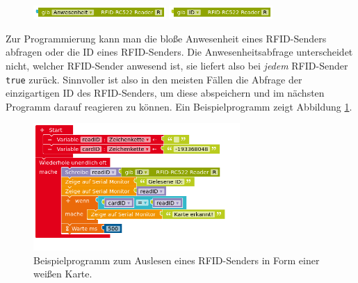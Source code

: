 \begin{figure}
	\centering
	\vspace{-0.5\baselineskip}
	\includegraphics[width=0.45\textwidth]{./pics/rfid-gibAnwesenheit.png}
	\includegraphics[width=0.35\textwidth]{./pics/rfid-gibID.png}
	\vspace{-0.5\baselineskip}
\end{figure}
Zur Programmierung kann man die bloße Anwesenheit eines RFID-Senders abfragen oder die ID eines RFID-Senders. Die Anwesenheitsabfrage unterscheidet nicht, welcher RFID-Sender anwesend ist, sie liefert also bei \emph{jedem} RFID-Sender \texttt{true} zurück. Sinnvoller ist also in den meisten Fällen die Abfrage der einzigartigen ID des RFID-Senders, um diese abspeichern und im nächsten Programm darauf reagieren zu können. Ein Beispielprogramm zeigt Abbildung \ref{abb:rfid-bsp}.

\begin{figure}[H]
	\centering
	\includegraphics[width=0.7\textwidth]{./pics/rfid-bsp.png}
	\caption{Beispielprogramm zum Auslesen eines RFID-Senders in Form einer weißen Karte.}
	\label{abb:rfid-bsp}
\end{figure}

